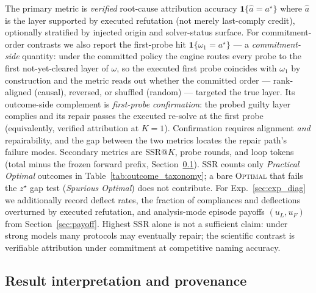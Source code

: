 \documentclass[a4paper,fleqn]{cas-sc}
\begin{document}
The primary metric is \emph{verified} root-cause attribution accuracy
$\mathbf{1}\{\hat{a}=a^{\star}\}$ where $\hat{a}$ is the layer supported by
executed refutation (not merely last-comply credit), optionally stratified by
injected origin and solver-status surface. For commitment-order contrasts we
also report the first-probe hit $\mathbf{1}\{\omega_1=a^{\star}\}$ --- a
\emph{commitment-side} quantity: under the committed policy the engine
routes every probe to the first not-yet-cleared layer of $\omega$, so the
executed first probe coincides with $\omega_1$ by construction and the
metric reads out whether the committed order --- rank-aligned (causal),
reversed, or shuffled (random) --- targeted the true layer. Its
outcome-side complement is \emph{first-probe confirmation}: the probed
guilty layer complies and its repair passes the executed re-solve at the
first probe (equivalently, verified attribution at $K{=}1$). Confirmation
requires alignment \emph{and} repairability, and the gap between the two
metrics locates the repair path's failure modes. Secondary
metrics are SSR@$K$, probe rounds, and loop tokens (total minus the
frozen forward prefix, Section~\ref{sec:exp_reporting}). SSR counts only
\emph{Practical Optimal} outcomes in Table~\ref{tab:outcome_taxonomy}; a bare
\textsc{Optimal} that fails the $z^{\star}$ gap test
(\emph{Spurious Optimal}) does not contribute. For
Exp.~\ref{sec:exp_diag} we additionally record deflect rates, the fraction of
compliances and deflections overturned by executed refutation, and
analysis-mode episode payoffs $(u_L,u_F)$ from Section~\ref{sec:payoff}.
Highest SSR alone is not a sufficient claim: under strong models many
protocols may eventually repair; the scientific contrast is verifiable
attribution under commitment at competitive naming accuracy.

\subsection{Result interpretation and provenance}
\label{sec:exp_reporting}
\end{document}
